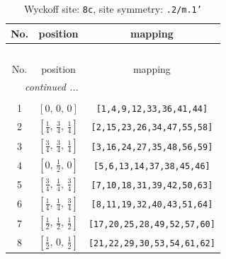 \documentclass[fleqn,8pt]{jsarticle}
\begin{document}
\begin{longtable}{ccc}
\caption{Wyckoff site: {\tt 8c}, site symmetry: {\tt .2/m.1'}}
 \\
 \hline \hline
No. & position & mapping \\ \hline \endfirsthead

\multicolumn{2}{l}{\tablename\ \thetable{}} \\
 \hline \hline
No. & position & mapping \\ \hline \endhead

 \hline \hline
\multicolumn{2}{r}{\footnotesize\it continued ...} \\ \endfoot

 \hline \hline
\multicolumn{2}{r}{} \\ \endlastfoot

1 & $\left[ 0,\, 0,\, 0 \right]$ & {\tt [1,4,9,12,33,36,41,44]} \\ \hline
2 & $\left[ \frac{1}{4},\, \frac{3}{4},\, \frac{1}{4} \right]$ & {\tt [2,15,23,26,34,47,55,58]} \\ \hline
3 & $\left[ \frac{3}{4},\, \frac{3}{4},\, \frac{1}{4} \right]$ & {\tt [3,16,24,27,35,48,56,59]} \\ \hline
4 & $\left[ 0,\, \frac{1}{2},\, 0 \right]$ & {\tt [5,6,13,14,37,38,45,46]} \\ \hline
5 & $\left[ \frac{3}{4},\, \frac{1}{4},\, \frac{3}{4} \right]$ & {\tt [7,10,18,31,39,42,50,63]} \\ \hline
6 & $\left[ \frac{1}{4},\, \frac{1}{4},\, \frac{3}{4} \right]$ & {\tt [8,11,19,32,40,43,51,64]} \\ \hline
7 & $\left[ \frac{1}{2},\, \frac{1}{2},\, \frac{1}{2} \right]$ & {\tt [17,20,25,28,49,52,57,60]} \\ \hline
8 & $\left[ \frac{1}{2},\, 0,\, \frac{1}{2} \right]$ & {\tt [21,22,29,30,53,54,61,62]} \\
\end{longtable}
\renewcommand{\arraystretch}{1.2}
\end{document}
